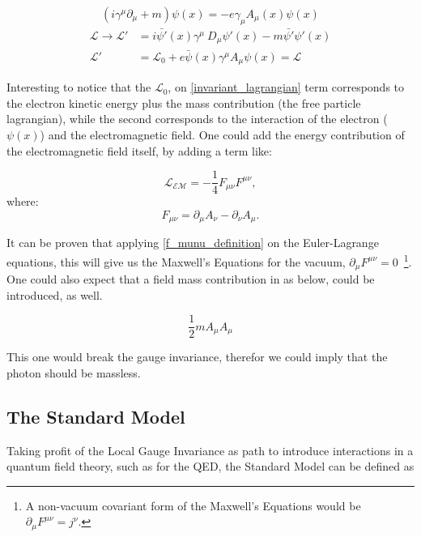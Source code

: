 \begin{equation}
        (i \gamma^\mu \partial_\mu + m)\psi(x) = -e\gamma_\mu A_\mu(x) \psi(x) 
    \label{invariant_dirac_equation}
\end{equation}
\begin{equation}
    \begin{split}
        \mathcal{L} \rightarrow \mathcal{L'} &= i\bar{\psi'}(x)\gamma^\mu\ D_\mu\psi'(x)-m\bar{\psi'}\psi'(x) \\
        \mathcal{L'} &= \mathcal{L_{\text{0}}} + e\bar{\psi}(x)\gamma^\mu A_\mu \psi(x) = \mathcal{L}
    \end{split}
    \label{invariant_lagrangian}
\end{equation}

Interesting to notice that the $\mathcal{L_{\text{0}}}$, on \ref{invariant_lagrangian} term corresponds to the electron kinetic energy plus the mass contribution (the free particle lagrangian), while the second corresponds to the interaction of the electron ($\psi(x)$) and the electromagnetic field. One could add the energy contribution of the electromagnetic field itself, by adding a term like:

\begin{equation}
    \mathcal{L_{\text{EM}}} = - \frac{1}{4} F_{\mu\nu} F^{\mu\nu},
\label{lagragian_em}
\end{equation}
where:
\begin{equation}
    F_{\mu\nu} = \partial_\mu A_\nu - \partial_\nu A_\mu.
\label{f_munu_definition}
\end{equation}

It can be proven that applying \ref{f_munu_definition} on the Euler-Lagrange equations, this will give us the Maxwell's Equations for the vacuum, $\partial_{\mu} F^{\mu\nu} = 0$~\footnote{A non-vacuum covariant form of the Maxwell's Equations would be $\partial_{\mu} F^{\mu\nu} = j^{\nu}$.}. One could also expect that a field mass contribution in as below, could be introduced, as well.

\begin{equation}
    \frac{1}{2}m A_\mu A_\mu
\label{photon_mass_term}
\end{equation}

This one would break the gauge invariance, therefor we could imply that the photon should be massless.

\subsection{The Standard Model}

Taking profit of the Local Gauge Invariance as path to introduce interactions in a quantum field theory, such as for the QED, the Standard Model can be defined as 



